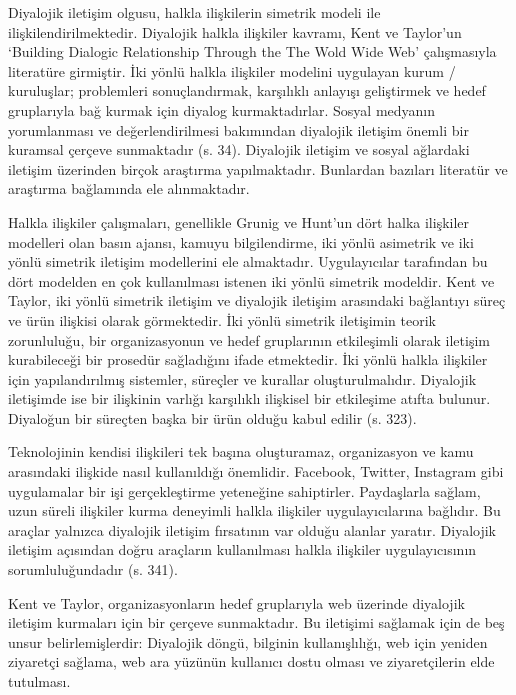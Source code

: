 \documentclass[
]{book}
\begin{document}
Diyalojik iletişim olgusu, halkla ilişkilerin simetrik modeli ile ilişkilendirilmektedir. Diyalojik halkla ilişkiler kavramı, Kent ve Taylor'un `Building Dialogic Relationship Through the The Wold Wide Web' çalışmasıyla literatüre girmiştir. İki yönlü halkla ilişkiler modelini uygulayan kurum / kuruluşlar; problemleri sonuçlandırmak, karşılıklı anlayışı geliştirmek ve hedef gruplarıyla bağ kurmak için diyalog kurmaktadırlar. Sosyal medyanın yorumlanması ve değerlendirilmesi bakımından diyalojik iletişim önemli bir kuramsal çerçeve sunmaktadır (s. 34). \citep{gunay2018sosyal} Diyalojik iletişim ve sosyal ağlardaki iletişim üzerinden birçok araştırma yapılmaktadır. Bunlardan bazıları literatür ve araştırma bağlamında ele alınmaktadır.

Halkla ilişkiler çalışmaları, genellikle Grunig ve Hunt'un dört halka ilişkiler modelleri olan basın ajansı, kamuyu bilgilendirme, iki yönlü asimetrik ve iki yönlü simetrik iletişim modellerini ele almaktadır. Uygulayıcılar tarafından bu dört modelden en çok kullanılması istenen iki yönlü simetrik modeldir. Kent ve Taylor, iki yönlü simetrik iletişim ve diyalojik iletişim arasındaki bağlantıyı süreç ve ürün ilişkisi olarak görmektedir. İki yönlü simetrik iletişimin teorik zorunluluğu, bir organizasyonun ve hedef gruplarının etkileşimli olarak iletişim kurabileceği bir prosedür sağladığını ifade etmektedir. İki yönlü halkla ilişkiler için yapılandırılmış sistemler, süreçler ve kurallar oluşturulmalıdır. Diyalojik iletişimde ise bir ilişkinin varlığı karşılıklı ilişkisel bir etkileşime atıfta bulunur. Diyaloğun bir süreçten başka bir ürün olduğu kabul edilir (s. 323). \citep{kent1998building}

Teknolojinin kendisi ilişkileri tek başına oluşturamaz, organizasyon ve kamu arasındaki ilişkide nasıl kullanıldığı önemlidir. Facebook, Twitter, Instagram gibi uygulamalar bir işi gerçekleştirme yeteneğine sahiptirler. Paydaşlarla sağlam, uzun süreli ilişkiler kurma deneyimli halkla ilişkiler uygulayıcılarına bağlıdır. Bu araçlar yalnızca diyalojik iletişim fırsatının var olduğu alanlar yaratır. Diyalojik iletişim açısından doğru araçların kullanılması halkla ilişkiler uygulayıcısının sorumluluğundadır (s. 341). \citep{rybalko2010dialogic}

Kent ve Taylor, organizasyonların hedef gruplarıyla web üzerinde diyalojik iletişim kurmaları için bir çerçeve sunmaktadır. Bu iletişimi sağlamak için de beş unsur belirlemişlerdir: Diyalojik döngü, bilginin kullanışlılığı, web için yeniden ziyaretçi sağlama, web ara yüzünün kullanıcı dostu olması ve ziyaretçilerin elde tutulması. \citep{kent1998building}
\end{document}
